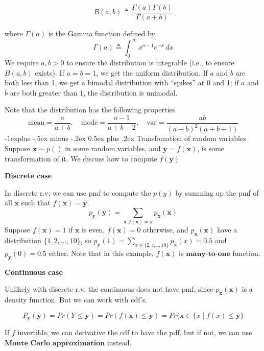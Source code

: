\documentclass[10pt,landscape]{article}
\makeatletter
\newcommand{\inp}{\textbf{x}}
\newcommand{\out}{\textbf{y}}
\renewcommand{\subsection}{\@startsection{subsection}{2}{0mm}%
                                {-1explus -.5ex minus -.2ex}%
                                {0.5ex plus .2ex}%
                                {\normalfont\normalsize\bfseries}}
\makeatother
\begin{document}
\begin{multicols*}{3}
\[
B(a, b) \triangleq \frac{\Gamma(a) \Gamma(b)}{\Gamma(a + b)} 
\]

where $\Gamma(a)$ is the Gamma function defined by
\[
\Gamma(a) \triangleq \int_{0}^{\infty} x^{a-1} e^{-x} \,dx 
\]
We require $a, b > 0$ to ensure the distribution is integrable (i.e., to ensure $B(a, b)$ exists). If $a = b = 1$, we get the uniform distribution. If $a$ and $b$ are both less than 1, we get a bimodal distribution with ``spikes'' at 0 and 1; if $a$ and $b$ are both greater than 1, the distribution is unimodal.

Note that the distribution has the following properties
\[
    \text{mean} = \frac{a}{a+b}, \quad \text{mode} = \frac{a-1}{a+b-2}, \quad \text{var} = \frac{ab}{(a+b)^2(a+b+1)}
\]
\subsection{Transfomation of random variables}
Suppose $\inp\sim p()$ in some random variables, and $\out=f(\inp)$, is some transformation of it. We discuss how to compute $f(\out)$

\textbf{Discrete case}

In discrete r.v, we can use pmf to compute the $p(y)$ by summing up the pmf of all $\inp$ such that $f(\inp)=\out$.
\[
    p_{\out}(\out)=\sum_{\inp:f(\inp)=\out}p_{\inp}(\inp)
\]
Suppose $f(\inp)=1$ if $\inp$ is even, $f(\inp)=0$ otherwise, and \(p_{\inp}(\inp)\) have a distribution $\{1,2,...,10\}$, so $p_{\out}(1)=\sum_{x\in\{2,4,..,10\}}p_{\inp}(x)=0.5$ and $p_{\out}(0)=0.5$ either. Note that in this example, $f(\inp)$ is $\textbf{many-to-one}$ function.

\textbf{Continuous case}

Unlikely with discrete r.v, the continuous does not have pmf, since $p_{\inp}(\inp)$ is a density function. But we can work with cdf's.

\[
    P_{\out}(\out)=Pr(Y\leq \out) = Pr(f(\inp) \leq \out)=Pr(\inp\in\{x \mid f(x) \leq \out\}
\]

If $f$ invertible, we can derivative the cdf to have the pdf, but if not, we can use $\textbf{Monte Carlo approximation}$ instead.


\end{multicols*}
\end{document}
